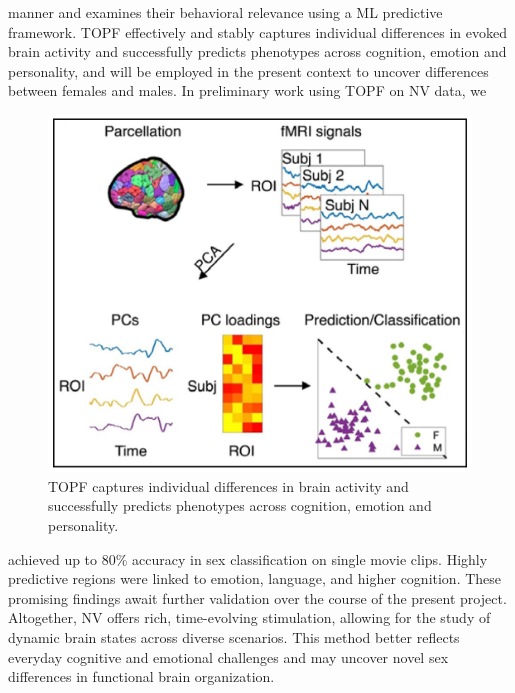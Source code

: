 \documentclass[11pt,a4paper]{article}
\begin{document}
manner and examines their behavioral relevance using a ML predictive framework. 
TOPF effectively and stably captures individual differences in evoked brain activity and successfully predicts phenotypes across 
cognition, emotion and personality, and will be employed in the present context to uncover differences between 
females and males. In preliminary work using TOPF \parencite{liTopographybasedPredictiveFramework2023a} on NV data, we 
\begin{figure} %
  \vspace{-10pt} %
  \includegraphics[width=\linewidth]{topf_neu.png}
  \caption{TOPF captures individual differences in brain activity and successfully predicts phenotypes across cognition, emotion and personality.}
  \label{fig:topf}
\end{figure}
achieved up to 80\% accuracy in sex classification on single movie clips. Highly predictive regions were 
linked to emotion, language, and higher cognition. These promising findings await further validation over 
the course of the present project. Altogether, NV offers rich, time-evolving stimulation, allowing for the 
study of dynamic brain states across diverse scenarios. This method better reflects everyday cognitive and 
emotional challenges and may uncover novel sex differences in functional brain organization.
\par\vspace{-1\parskip}\noindent
\end{document}
